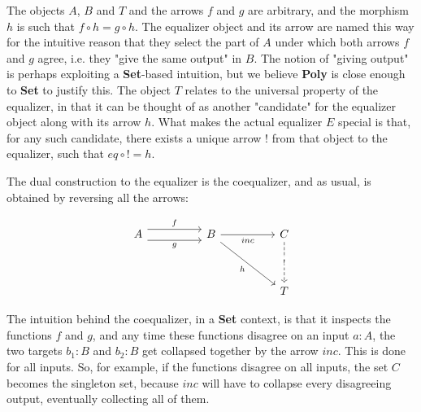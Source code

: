The objects $A$, $B$ and $T$ and the arrows $f$ and $g$ are arbitrary, and the morphism $h$ is such that $f \circ h = g \circ h$. The equalizer object and its arrow are named this way for the intuitive reason that they select the part of $A$ under which both arrows $f$ and $g$ agree, i.e. they "give the same output" in $B$. The notion of "giving output" is perhaps exploiting a \textbf{Set}-based intuition, but we believe \textbf{Poly} is close enough to \textbf{Set} to justify this. The object $T$ relates to the universal property of the equalizer, in that it can be thought of as another "candidate" for the equalizer object along with its arrow $h$. What makes the actual equalizer $E$ special is that, for any such candidate, there exists a unique arrow $!$ from that object to the equalizer, such that $eq \circ ! = h$.

The dual construction to the equalizer is the coequalizer, and as usual, is obtained by reversing all the arrows:

\[\begin{tikzcd}
	A && B && C \\
	\\
	&&&& T
	\arrow["f", shift left=2, from=1-1, to=1-3]
	\arrow["g"', shift right=2, from=1-1, to=1-3]
	\arrow["inc"', from=1-3, to=1-5]
	\arrow["{!}"{description}, dashed, from=1-5, to=3-5]
	\arrow["h"', from=1-3, to=3-5]
\end{tikzcd}\]

The intuition behind the coequalizer, in a \textbf{Set} context, is that it inspects the functions $f$ and $g$, and any time these functions disagree on an input $a : A$, the two targets $b_1 : B$ and $b_2 : B$ get collapsed together by the arrow $inc$. This is done for all inputs. So, for example, if the functions disagree on all inputs, the set $C$ becomes the singleton set, because $inc$ will have to collapse every disagreeing output, eventually collecting all of them.

